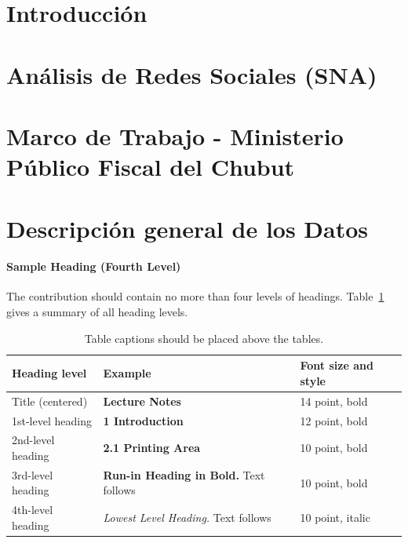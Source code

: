 \documentclass[runningheads]{llncs}
\begin{document}
%

\maketitle              %
%
\begin{abstract}

\end{abstract}
%
%
\section{Introducción}


\section{Análisis de Redes Sociales (SNA)}


\section{Marco de Trabajo - Ministerio Público Fiscal del Chubut}


\section{Descripción general de los Datos}



\paragraph{Sample Heading (Fourth Level)}
The contribution should contain no more than four levels of
headings. Table~\ref{tab1} gives a summary of all heading levels.

\begin{table}
\caption{Table captions should be placed above the
tables.}\label{tab1}
\begin{tabular}{|l|l|l|}
\hline
Heading level &  Example & Font size and style\\
\hline
Title (centered) &  {\Large\bfseries Lecture Notes} & 14 point, bold\\
1st-level heading &  {\large\bfseries 1 Introduction} & 12 point, bold\\
2nd-level heading & {\bfseries 2.1 Printing Area} & 10 point, bold\\
3rd-level heading & {\bfseries Run-in Heading in Bold.} Text follows & 10 point, bold\\
4th-level heading & {\itshape Lowest Level Heading.} Text follows & 10 point, italic\\
\hline
\end{tabular}
\end{table}
\end{document}
